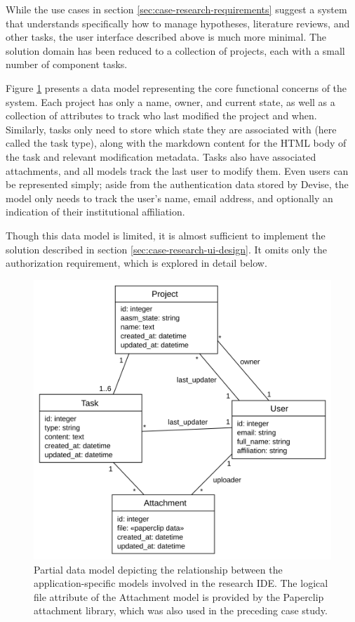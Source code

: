 \documentclass[document.tex]{subfiles}
\begin{document}
While the use cases in section \ref{sec:case-research-requirements} suggest a system that understands specifically how to manage hypotheses, literature reviews, and other tasks, the user interface described above is much more minimal. The solution domain has been reduced to a collection of projects, each with a small number of component tasks.

Figure \ref{fig:case-research-data-model} presents a data model representing the core functional concerns of the system. Each project has only a name, owner, and current state, as well as a collection of attributes to track who last modified the project and when. Similarly, tasks only need to store which state they are associated with (here called the task type), along with the markdown content for the HTML body of the task and relevant modification metadata. Tasks also have associated attachments, and all models track the last user to modify them. Even users can be represented simply; aside from the authentication data stored by Devise, the model only needs to track the user's name, email address, and optionally an indication of their institutional affiliation.

Though this data model is limited, it is almost sufficient to implement the solution described in section \ref{sec:case-research-ui-design}. It omits only the authorization requirement, which is explored in detail below.

\begin{figure}[!ht]
\centering \includegraphics[width=5.0in]{./img/case-study-research-railgun/data-model}
\caption{Partial data model depicting the relationship between the application-specific models involved in the research IDE. The logical file attribute of the Attachment model is provided by the Paperclip attachment library, which was also used in the preceding case study.}
\label{fig:case-research-data-model}
\end{figure}
\end{document}
